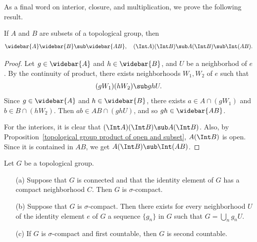 As a final word on interior, closure, and multiplication, we prove the following result.
\begin{proposition}\label{topological group int and closure under product}
If $A$ and $B$ are subsets of a topological group, then
\[\widebar{A}\widebar{B}\sub\widebar{AB},\quad(\Int A)(\Int B)\sub A(\Int B)\sub\Int(AB).\]
\end{proposition}
\begin{proof}
Let $g\in\widebar{A}$ and $h\in\widebar{B}$, and $U$ be a neighborhod of $e$. By the continuity of product, there exists neighborhoods $W_1,W_2$ of $e$ such that
\[(gW_1)(hW_2)\sub ghU.\]
Since $g\in\widebar{A}$ and $h\in\widebar{B}$, there exists $a\in A\cap(gW_1)$ and $b\in B\cap(hW_2)$. Then $ab\in AB\cap(ghU)$, and so $gh\in\widebar{AB}$.\par
For the interiors, it is clear that $(\Int A)(\Int B)\sub A(\Int B)$. Also, by Proposition~\ref{topological group product of open and subset}, $A(\Int B)$ is open. Since it is contained in $AB$, we get $A(\Int B)\sub\Int(AB)$.
\end{proof}
\begin{proposition}\label{topological group compactness}
Let $G$ be a topological group.
\begin{itemize}
\item[(a)] Suppose that $G$ is connected and that the identity element of $G$ has a compact neighborhood $C$. Then $G$ is $\sigma$-compact.
\item[(b)] Suppose that $G$ is $\sigma$-compact. Then there exists for every neighborhood $U$ of the identity element $e$ of $G$ a sequence $\{g_n\}$ in $G$ such that $G=\bigcup_ng_nU$.
\item[(c)] If $G$ is $\sigma$-compact and first countable, then $G$ is second countable.
\end{itemize}
\end{proposition}
